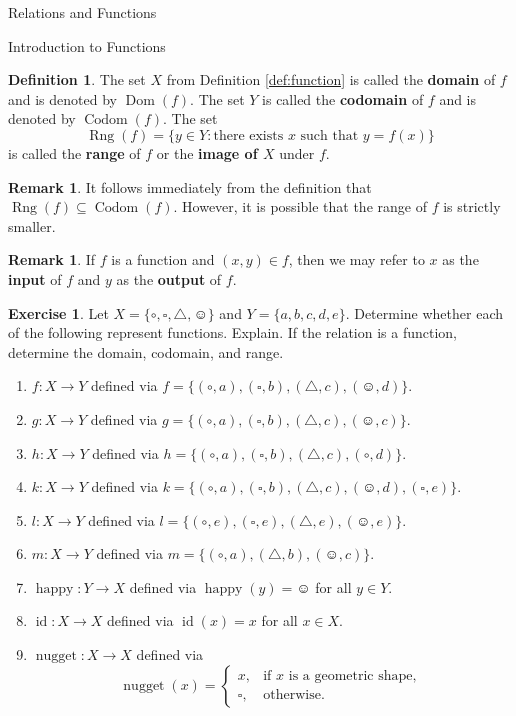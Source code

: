 \documentclass[11pt]{article}
\newcommand{\dom}{\operatorname{Dom}}
\newcommand{\codom}{\operatorname{Codom}}
\newcommand{\range}{\operatorname{Rng}}
\theoremstyle{definition}
\newtheorem{definition}[theorem]{Definition}
\newtheorem{exercise}[theorem]{Exercise}
\newtheorem{remark}[theorem]{Remark}
\begin{document}
\begin{section}{Relations and Functions}
\begin{subsection}{Introduction to Functions}
\begin{definition}
The set $X$ from Definition \ref{def:function} is called the \textbf{domain} of $f$ and is denoted by $\dom(f)$.  The set $Y$ is called the \textbf{codomain} of $f$ and is denoted by $\codom(f)$.  The set
\[
\range(f)=\{y\in Y: \mbox{there exists }x\mbox{ such that } y=f(x)\}
\]
is called the \textbf{range} of $f$ or the \textbf{image of $X$} under $f$.
\end{definition}

\begin{remark}
It follows immediately from the definition that $\range(f)\subseteq \codom(f)$.  However, it is possible that the range of $f$ is strictly smaller.
\end{remark}

\begin{remark}
If $f$ is a function and $(x,y)\in f$, then we may refer to $x$ as the \textbf{input} of $f$ and $y$ as the \textbf{output} of $f$.
\end{remark}

\begin{exercise}\label{exer:lots}
Let $X=\{\circ, \square,\triangle,\smiley\}$ and $Y=\{a,b,c,d,e\}$.  Determine whether each of the following represent functions.  Explain.  If the relation is a function, determine the domain, codomain, and range.

\begin{enumerate}
\item $f:X\to Y$ defined via $f=\{(\circ, a),(\square,b),(\triangle,c),(\smiley,d)\}$.
\item $g:X\to Y$ defined via $g=\{(\circ, a),(\square,b),(\triangle,c),(\smiley,c)\}$.
\item $h:X\to Y$ defined via $h=\{(\circ, a),(\square,b),(\triangle,c),(\circ,d)\}$.
\item $k:X\to Y$ defined via $k=\{(\circ, a),(\square,b),(\triangle,c),(\smiley,d),(\square,e)\}$.
\item $l:X\to Y$ defined via $l=\{(\circ, e),(\square,e),(\triangle,e),(\smiley,e)\}$.
\item $m:X\to Y$ defined via $m=\{(\circ, a),(\triangle,b),(\smiley,c)\}$.
\item $\operatorname{happy}:Y\to X$ defined via $\operatorname{happy}(y)=\smiley$ for all $y\in Y$.
\item $\operatorname{id}:X\to X$ defined via $\operatorname{id}(x)=x$ for all $x\in X$.
\item $\operatorname{nugget}:X\to X$ defined via 
\[
\operatorname{nugget}(x)=\begin{cases}
x, & \mbox{if } x\mbox{ is a geometric shape},\\
\square, & \mbox{otherwise}.
\end{cases}
\]
\end{enumerate}
\end{exercise}


\end{subsection}
\end{section}
\end{document}
